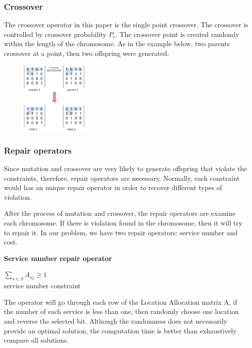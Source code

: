 \documentclass[twoside]{article}
\begin{document}
\subsubsection{Crossover}
The crossover operator in this paper is the single point crossover. 
The crossover is controlled by crossover probability $P_{c}$. 
The crossover point is created randomly within the length of the chromosome. 
As in the example below, two parents crossover at a point, then two offspring were generated.
\begin{figure}[ht]
\centering
	\includegraphics[width=0.3\textwidth]{pics/crossover.png}
\caption{}
\label{graph1}
\end{figure}


\subsubsection{Repair operators}
Since mutation and crossover are very likely to generate offspring that violate the constraints, therefore, 
repair operators are necessary. Normally, each constraint would has an unique repair operator 
in order to recover different types of violation.

After the process of mutation and crossover, the repair operators are examine each chromosome. 
If there is violation found in the chromosome, then it will try to repair it. 
In our problem, we have two repair operators: service number and cost.

\begin{flushleft}\textbf{Service number repair operator}\end{flushleft}
\begin{center}
		$\sum\limits_{s \in S} A_{sj} \geq 1$ \\
		service number constraint
\end{center}
The operator will go through each row of the Location Allocation matrix A, if the number of each 
service is less than one, then randomly choose one location and reverse the selected bit. 
Although the randomness does not necessarily provide an optimal solution, the computation time is 
better than exhaustively compare all solutions. 
\end{document}
